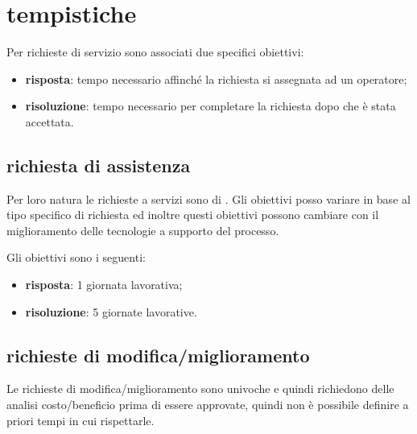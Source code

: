 %
%
\section[Tempistiche]{tempistiche}
\label{rf-target}
Per richieste di servizio sono associati due specifici obiettivi:

\begin{itemize}
\item{\textbf{risposta}: tempo necessario affinché la richiesta si assegnata ad un operatore;}
\item{\textbf{risoluzione}: tempo necessario per completare la richiesta dopo che è stata accettata.}
\end{itemize}

\subsection[Richieste di assistenza]{richiesta di assistenza}
\label{rf-target-asr}
Per loro natura le richieste a servizi  sono di . Gli obiettivi posso variare in base al tipo specifico di richiesta ed inoltre questi obiettivi possono cambiare con il miglioramento delle tecnologie a supporto del processo.

Gli obiettivi sono i seguenti:

\begin{itemize}
\item{\textbf{risposta}: 1 giornata lavorativa;}
\item{\textbf{risoluzione}: 5 giornate lavorative.}
\end{itemize}

\subsection[Richieste di modifica/miglioramento]{richieste di modifica/miglioramento}
\label{rf-target-ecr}
Le richieste di modifica/miglioramento sono univoche e quindi richiedono delle analisi costo/beneficio prima di essere approvate, quindi non è possibile definire a priori tempi in cui rispettarle.
